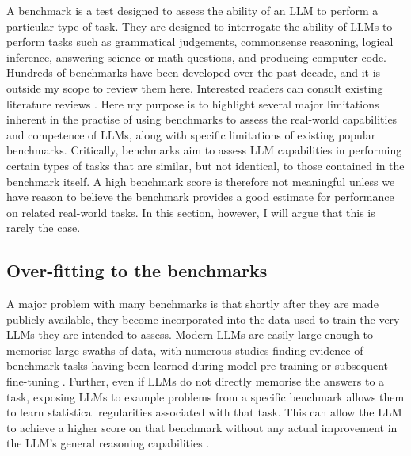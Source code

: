 \documentclass{article}
\begin{document}
A benchmark is a test designed to assess the ability of an LLM to perform a particular type of task. They are designed to interrogate the ability of LLMs to perform tasks such as grammatical judgements, commonsense reasoning, logical inference, answering science or math questions, and producing computer code. Hundreds of benchmarks have been developed over the past decade, and it is outside my scope to review them here. Interested readers can consult existing literature reviews \citep{chang2024survey, ivanov2024ai, minaee2024large}. Here my purpose is to highlight several major limitations inherent in the practise of using benchmarks to assess the real-world capabilities and competence of LLMs, along with specific limitations of existing popular benchmarks. Critically, benchmarks aim to assess LLM capabilities in performing certain types of tasks that are similar, but not identical, to those contained in the benchmark itself. A high benchmark score is therefore not meaningful unless we have reason to believe the benchmark provides a good estimate for performance on related real-world tasks. In this section, however, I will argue that this is rarely the case. 

\subsection{Over-fitting to the benchmarks}

A major problem with many benchmarks is that shortly after they are made publicly available, they become incorporated into the data used to train the very LLMs they are intended to assess. Modern LLMs are easily large enough to memorise large swaths of data, with numerous studies finding evidence of benchmark tasks having been learned during model pre-training or subsequent fine-tuning \citep{laskar2024systematic, satvaty2024undesirable, wang2024generalization}. Further, even if LLMs do not directly memorise the answers to a task, exposing LLMs to example problems from a specific benchmark allows them to learn statistical regularities associated with that task. This can allow the LLM to achieve a higher score on that benchmark without any actual improvement in the LLM's general reasoning capabilities \citep{laskar2024systematic}. 
\end{document}

